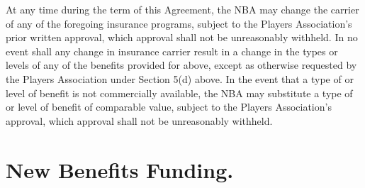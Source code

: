\documentclass[
]{book}
\begin{document}
At any time during the term of this Agreement, the NBA may change the carrier of any of the foregoing insurance programs, subject to the Players Association's prior written approval, which approval shall not be unreasonably withheld. In no event shall any change in insurance carrier result in a change in the types or levels of any of the benefits provided for above, except as otherwise requested by the Players Association under Section 5(d) above. In the event that a type of or level of benefit is not commercially available, the NBA may substitute a type of or level of benefit of comparable value, subject to the Players Association's approval, which approval shall not be unreasonably withheld.

\hypertarget{new-benefits-funding.}{%
\section{New Benefits Funding.}\label{new-benefits-funding.}}
\end{document}
